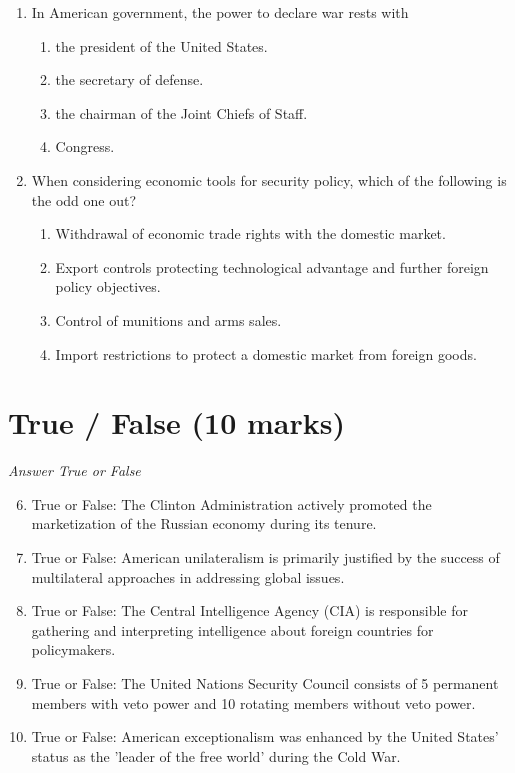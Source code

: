 \documentclass[12pt]{article}
\begin{document}
\begin{enumerate}[label=\arabic*.]
\item In American government, the power to declare war rests with
\begin{enumerate}[label=(\alph*)]
    \item the president of the United States.
    \item the secretary of defense.
    \item the chairman of the Joint Chiefs of Staff.
    \item Congress.
\end{enumerate}
\item When considering economic tools for security policy, which of the following is the odd one out?
\begin{enumerate}[label=(\alph*)]
    \item Withdrawal of economic trade rights with the domestic market.
    \item Export controls protecting technological advantage and further foreign policy objectives.
    \item Control of munitions and arms sales.
    \item Import restrictions to protect a domestic market from foreign goods.
\end{enumerate}
\end{enumerate}

\section*{True / False (10 marks)}
\textit{Answer True or False}
\begin{enumerate}[label=\arabic*.]
\setcounter{enumi}{5}
\item True or False: The Clinton Administration actively promoted the marketization of the Russian economy during its tenure.
\item True or False: American unilateralism is primarily justified by the success of multilateral approaches in addressing global issues.
\item True or False: The Central Intelligence Agency (CIA) is responsible for gathering and interpreting intelligence about foreign countries for policymakers.
\item True or False: The United Nations Security Council consists of 5 permanent members with veto power and 10 rotating members without veto power.
\item True or False: American exceptionalism was enhanced by the United States' status as the 'leader of the free world' during the Cold War.
\end{enumerate}
\end{document}

